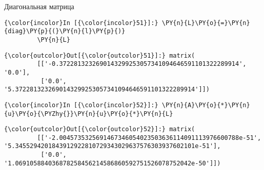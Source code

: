     Диагональная матрица

    \begin{Verbatim}[commandchars=\\\{\}]
{\color{incolor}In [{\color{incolor}51}]:} \PY{n}{L}\PY{o}{=}\PY{n}{diag}\PY{p}{(}\PY{n}{l}\PY{p}{)}
         \PY{n}{L}
\end{Verbatim}

            \begin{Verbatim}[commandchars=\\\{\}]
{\color{outcolor}Out[{\color{outcolor}51}]:} matrix(
         [['-0.3722813232690143299253057341094646591101322289914', '0.0'],
          ['0.0', '5.3722813232690143299253057341094646591101322289914']])
\end{Verbatim}
        
    \begin{Verbatim}[commandchars=\\\{\}]
{\color{incolor}In [{\color{incolor}52}]:} \PY{n}{A}\PY{o}{*}\PY{n}{u}\PY{o}{\PYZhy{}}\PY{n}{u}\PY{o}{*}\PY{n}{L}
\end{Verbatim}

            \begin{Verbatim}[commandchars=\\\{\}]
{\color{outcolor}Out[{\color{outcolor}52}]:} matrix(
         [['-2.0045735325691467346054023503636114091113976600788e-51', '5.3455294201843912922810729343029637576303937602101e-51'],
          ['0.0', '1.069105884036878258456214586860592751526078752042e-50']])
\end{Verbatim}
